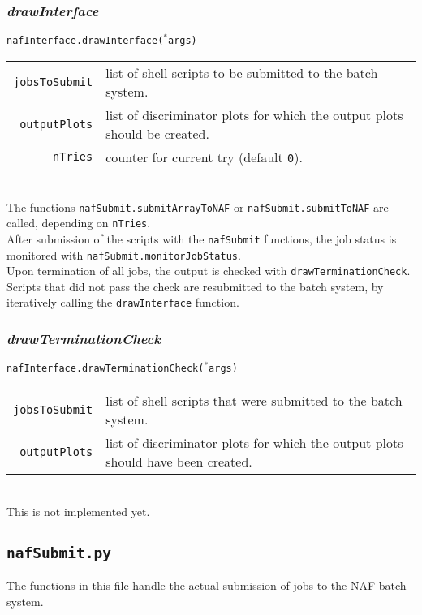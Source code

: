 \documentclass[12pt, a4paper]{article}
\newcommand{\args}{$^*$args}
\begin{document}
\subsubsection{\textit{drawInterface}}
\texttt{nafInterface.drawInterface(\args)}\\
\begin{tabular}{r|l}
\hline
\texttt{jobsToSubmit}	&	list of shell scripts to be submitted to the batch system.\\
\texttt{outputPlots}	&	list of discriminator plots for which the output plots should be created.\\
\texttt{nTries}			&	counter for current try (default \texttt{0}).\\
\hline
\end{tabular}
\\
The functions \texttt{nafSubmit.submitArrayToNAF} or \texttt{nafSubmit.submitToNAF} are called, depending on \texttt{nTries}.\\
After submission of the scripts with the \texttt{nafSubmit} functions, the job status is monitored with \texttt{nafSubmit.monitorJobStatus}.\\
Upon termination of all jobs, the output is checked with \texttt{drawTerminationCheck}. Scripts that did not pass the check are resubmitted to the batch system, by iteratively calling the \texttt{drawInterface} function.



\subsubsection{\textit{drawTerminationCheck}}
\texttt{nafInterface.drawTerminationCheck(\args)}\\
\begin{tabular}{r|l}
\hline
\texttt{jobsToSubmit}		&	list of shell scripts that were submitted to the batch system.\\
\texttt{outputPlots}		&	list of discriminator plots for which the output plots should have been created.\\
\hline
\end{tabular}
\\
This is not implemented yet.











\subsection{\texttt{nafSubmit.py}}
The functions in this file handle the actual submission of jobs to the NAF batch system.
\end{document}
